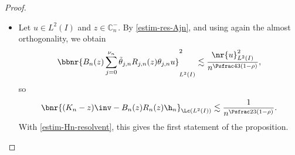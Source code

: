 \begin{proof}
\begin{itemize}
Let $\tilde \th \in C_0^\infty(\R,[0,1])$ be equal to 1 on $\big[-\sfrac 23,\sfrac 23\big]$ and supported in $]-1,1[$. Then for $n \in \N^*$, $j \in \Ii 1 {\nu_n}$ and $y \in \bar I$ we set
\[
\tilde \th_{j,n}(y) = \tilde \th \bigl(\psfrac {y-a_{j,n}}{\d_n} \bigr),
\]
and then
\begin{equation} \label{eq_def_Qn}
Q_n(z) = R_n(z) \h_n + \sum_{j=0}^{\nu_n} \tilde \theta_{j,n} R_{j,n}(z) \theta_{j,n}.
\end{equation}
For $u \in \Dom(K_n)$ and $z \in \C_n^-$ we have $\th_{j,n} u = \th_{j,n} \tilde \th_{j,n} u$ and
\[
\theta_{j,n} (K_n-z) (1- \tilde \theta_{j,n}) u = 0,
\]
so
\[
\nr{Q_n(z) (K_n-z) u - u }_{L^2(I)} \leq \nr{T_n(z) u}_{L^2(I)} + \bbnr{\sum_{j=0}^{\nu_n} \tilde \th_{j,n} T_{j,n}(z) \tilde \th_{j,n} u}_{L^2(I)}.
\]
Moreover $\tilde \th_{j,n} \tilde \th_{k,n} = 0$ whenever $\abs{j-k} \geq 2$, so by almost orthogonaly (twice) we can write
\begin{align*}
\bbnr{\sum_{j=0}^{\nu_n} \tilde \th_{j,n} T_{j,n}(z) \tilde \th_{j,n} u}^2_{L^2(I)}
& \lesssim \sum_{j=0}^{\nu_n} \nr{\tilde \th_{j,n} T_{j,n}(z) \tilde \th_{j,n} u}^2_{L^2(I)}\\
& \lesssim \sup_{0\leq j \leq \nu_n} \nr{T_{j,n}(z)}_{\Lc(L^2(I))}^2 \sum_{j=0}^{\nu_n} \nr{\tilde \th_{j,n} u}^2_{L^2(I)}\\
& \lesssim \sup_{0\leq j \leq \nu_n} \nr{T_{j,n}(z)}_{\Lc(L^2(I))}^2\, \nr{u}^2_{L^2(I)}.
\end{align*}
This proves
\begin{equation} \label{eq-Qn-Kn-z}
\sup_{z \in \C_n^-} \sup_{\substack{u \in \Dom(K_n)\\ \nr{u}_{L^2(I)} = 1}} \nr{Q_n(z) (K_n-z) u - u}_{L^2(I)} \limt n {+\infty} 0.
\end{equation}
Thus for $n$ large enough the operator $K_n$ has no eigenvalue and hence no spectrum in $\C_n^-$. Moreover for $z \in \C_n^-$ we have
\begin{equation} \label{eq-Qngoodapprox}
(K_n-z)\inv = B_n(z) Q_n(z),
\end{equation}
where
\[
B_n(z) = \bigl(1 + \bigl(Q_n(z) (K_n-z) - 1 \bigr) \bigr)\inv
\]
is bounded on $L^2(I)$ uniformly in $z \in \C_n^-$ and $n$ large enough.

\item
Let $u \in L^2(I)$ and $z \in \mathbb{C}_n^-$. By \eqref{estim-res-Ajn}, and using again the almost orthogonality, we obtain
\[
\bbnr{B_n(z) \sum_{j=0}^{\nu_n} \tilde \theta_{j,n} R_{j,n}(z) \theta_{j,n} u}^2_{L^2(I)} \lesssim \frac {\nr{u}^2_{L^2(I)}}{n ^{\Psfrac 43(1-\rho)}},
\]
so
\begin{equation} \label{eq-res-Kn-Rn}
\bnr{(K_n-z)\inv - B_n(z) R_n(z) \h_n }_{\Lc(L^2(I))} \lesssim \frac 1 {n^{\Psfrac 23(1-\rho)}}.
\end{equation}
With \eqref{estim-Hn-resolvent}, this gives the first statement of the proposition.


\end{itemize}
\end{proof}
